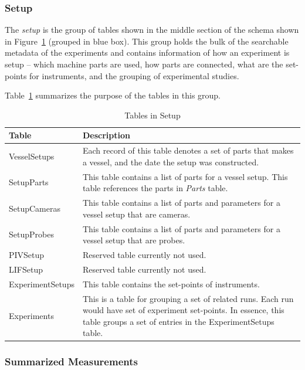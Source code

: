 \subsubsection{Setup}

The \emph{setup} is the group of tables shown in the middle section of the schema shown in Figure~\ref{tb_tables_in_setup} (grouped in blue box). This group holds the bulk of the searchable metadata of the experiments and contains information of how an experiment is setup -- which machine parts are used, how parts are connected, what are the set-points for instruments, and the grouping of experimental studies.

Table~\ref{tb_tables_in_setup} summarizes the purpose of the tables in this group.

\begin{table}[h!]
\centering
\caption{Tables in Setup}\label{tb_tables_in_setup}
\begin{tabular}{l p{12cm}} \hline
{\bf Table}         & {\bf Description}\\ \hline
VesselSetups    & Each record of this table denotes a set of parts that makes a vessel, and the date the setup was constructed.\\ \hline
SetupParts      & This table contains a list of parts for a vessel setup. This table references the parts in \emph{Parts} table.\\ \hline
SetupCameras    & This table contains a list of parts and parameters for a vessel setup that are cameras. \\ \hline
SetupProbes     &This table contains a list of parts and parameters for a vessel setup that are probes. \\ \hline
PIVSetup        & Reserved table currently not used.\\ \hline
LIFSetup        & Reserved table currently not used.\\ \hline
ExperimentSetups    & This table contains the set-points of instruments.\\ \hline
Experiments     & This is a table for grouping a set of related runs. Each run would have set of experiment set-points. In essence, this table groups a set of entries in the ExperimentSetups table.\\ \hline
\end{tabular}
\end{table}


\subsubsection{Summarized Measurements}

